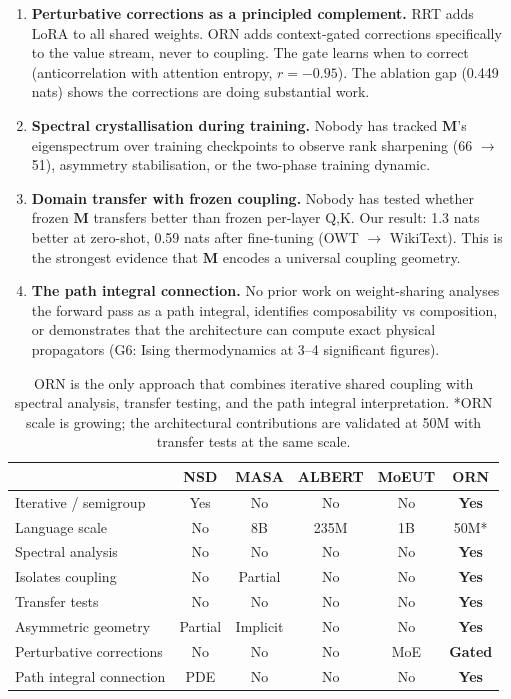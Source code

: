 \documentclass[11pt, a4paper]{article}
\newcommand{\M}{\mathbf{M}}
\theoremstyle{remark}
\begin{document}
\begin{enumerate}[nosep]
    \item \textbf{Perturbative corrections as a principled complement.}
    RRT adds LoRA to all shared weights.
    ORN adds context-gated corrections specifically to the value stream, never to coupling.
    The gate learns when to correct (anticorrelation with attention entropy, $r = -0.95$).
    The ablation gap (0.449 nats) shows the corrections are doing substantial work.

    \item \textbf{Spectral crystallisation during training.}
    Nobody has tracked $\M$'s eigenspectrum over training checkpoints to observe rank sharpening (66 $\to$ 51), asymmetry stabilisation, or the two-phase training dynamic.

    \item \textbf{Domain transfer with frozen coupling.}
    Nobody has tested whether frozen $\M$ transfers better than frozen per-layer Q,K.
    Our result: 1.3 nats better at zero-shot, 0.59 nats after fine-tuning (OWT $\to$ WikiText).
    This is the strongest evidence that $\M$ encodes a universal coupling geometry.

    \item \textbf{The path integral connection.}
    No prior work on weight-sharing analyses the forward pass as a path integral, identifies composability vs composition, or demonstrates that the architecture can compute exact physical propagators (G6: Ising thermodynamics at 3--4 significant figures).
\end{enumerate}

\begin{table}[h]
\centering\small
\begin{tabular}{@{}lccccc@{}}
\toprule
& \textbf{NSD} & \textbf{MASA} & \textbf{ALBERT} & \textbf{MoEUT} & \textbf{ORN} \\
\midrule
Iterative / semigroup & Yes & No & No & No & \textbf{Yes} \\
Language scale & No & 8B & 235M & 1B & 50M* \\
Spectral analysis & No & No & No & No & \textbf{Yes} \\
Isolates coupling & No & Partial & No & No & \textbf{Yes} \\
Transfer tests & No & No & No & No & \textbf{Yes} \\
Asymmetric geometry & Partial & Implicit & No & No & \textbf{Yes} \\
Perturbative corrections & No & No & No & MoE & \textbf{Gated} \\
Path integral connection & PDE & No & No & No & \textbf{Yes} \\
\bottomrule
\end{tabular}
\caption{ORN is the only approach that combines iterative shared coupling with spectral analysis, transfer testing, and the path integral interpretation. *ORN scale is growing; the architectural contributions are validated at 50M with transfer tests at the same scale.}
\end{table}
\end{document}
